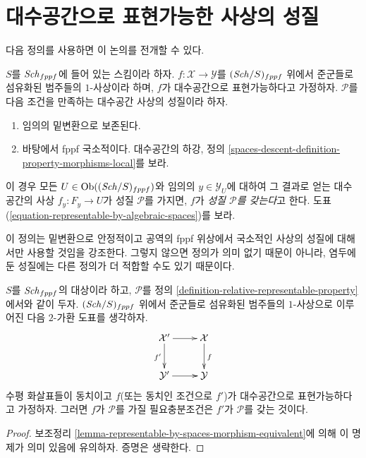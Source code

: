 \section{대수공간으로 표현가능한 사상의 성질}
\label{section-representable-properties}

\noindent
다음 정의를 사용하면 이 논의를 전개할 수 있다.

\begin{definition}
\label{definition-relative-representable-property}
$S$를 $\mathit{Sch}_{fppf}$에 들어 있는 스킴이라 하자.
$f : \mathcal{X} \to \mathcal{Y}$를 $(\mathit{Sch}/S)_{fppf}$ 위에서
준군들로 섬유화된 범주들의 $1$-사상이라 하며, $f$가 대수공간으로
표현가능하다고 가정하자. $\mathcal{P}$를 다음 조건을 만족하는
대수공간 사상의 성질이라 하자.
\begin{enumerate}
\item 임의의 밑변환으로 보존된다.
\item 바탕에서 fppf 국소적이다. 대수공간의 하강, 정의
\ref{spaces-descent-definition-property-morphisms-local}를 보라.
\end{enumerate}
이 경우 모든 $U \in \mathop{\mathrm{Ob}}\nolimits((\mathit{Sch}/S)_{fppf})$와 임의의
$y \in \mathcal{Y}_U$에 대하여 그 결과로 얻는 대수공간의 사상
$f_y : F_y \to U$가 성질 $\mathcal{P}$를 가지면, $f$가
{\it 성질 $\mathcal{P}$를 갖는다}고 한다. 도표
(\ref{equation-representable-by-algebraic-spaces})를 보라.
\end{definition}

\noindent
이 정의는 밑변환으로 안정적이고 공역의 fppf 위상에서 국소적인 사상의
성질에 대해서만 사용할 것임을 강조한다. 그렇지 않으면 정의가 의미 없기
때문이 아니라, 염두에 둔 성질에는 다른 정의가 더 적합할 수도 있기
때문이다.

\begin{lemma}
\label{lemma-property-morphism-equivalent}
$S$를 $\mathit{Sch}_{fppf}$의 대상이라 하고, $\mathcal{P}$를 정의
\ref{definition-relative-representable-property}에서와 같이 두자.
$(\mathit{Sch}/S)_{fppf}$ 위에서 준군들로 섬유화된 범주들의 $1$-사상으로
이루어진 다음 $2$-가환 도표를 생각하자.
$$
\xymatrix{
\mathcal{X}' \ar[r] \ar[d]_{f'} & \mathcal{X} \ar[d]^f \\
\mathcal{Y}' \ar[r] & \mathcal{Y}
}
$$
수평 화살표들이 동치이고 $f$(또는 동치인 조건으로 $f'$)가 대수공간으로
표현가능하다고 가정하자. 그러면 $f$가 $\mathcal{P}$를 가질
필요충분조건은 $f'$가 $\mathcal{P}$를 갖는 것이다.
\end{lemma}

\begin{proof}
보조정리 \ref{lemma-representable-by-spaces-morphism-equivalent}에 의해
이 명제가 의미 있음에 유의하자. 증명은 생략한다.
\end{proof}

